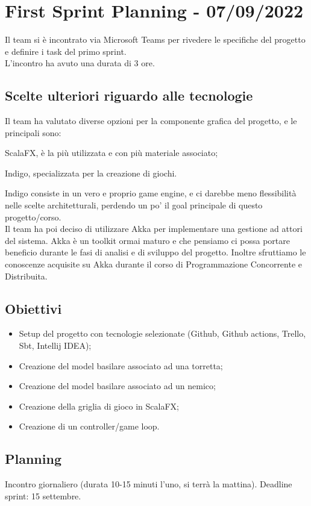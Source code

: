 \section{First Sprint Planning - 07/09/2022}
Il team si è incontrato via Microsoft Teams per rivedere le specifiche del progetto e definire i task del primo sprint.\\
L'incontro ha avuto una durata di 3 ore.

\subsection{Scelte ulteriori riguardo alle tecnologie}
Il team ha valutato diverse opzioni per la componente grafica del progetto, e le principali sono:
\item ScalaFX, è la più utilizzata e con più materiale associato;
\item Indigo, specializzata per la creazione di giochi.

Indigo consiste in un vero e proprio game engine, e ci darebbe meno flessibilità nelle scelte architetturali, perdendo un po' il goal principale di questo progetto/corso.\\

Il team ha poi deciso di utilizzare Akka per implementare una gestione ad attori del sistema. Akka è un toolkit ormai maturo e che pensiamo ci possa portare beneficio
durante le fasi di analisi e di sviluppo del progetto. Inoltre sfruttiamo le conoscenze acquisite su Akka durante il corso di Programmazione Concorrente e Distribuita.

\subsection{Obiettivi}
\begin{itemize}
  \item Setup del progetto con tecnologie selezionate (Github, Github actions, Trello, Sbt, Intellij IDEA);
  \item Creazione del model basilare associato ad una torretta;
  \item Creazione del model basilare associato ad un nemico;
  \item Creazione della griglia di gioco in ScalaFX;
  \item Creazione di un controller/game loop.
\end{itemize}

\subsection{Planning}
Incontro giornaliero (durata 10-15 minuti l'uno, si terrà la mattina).
Deadline sprint: 15 settembre.

